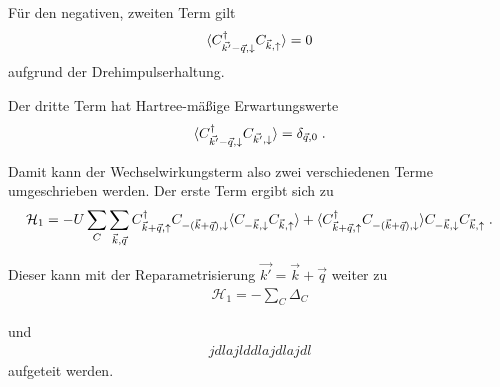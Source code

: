 Für den negativen, zweiten Term gilt
\begin{equation}
    \langle C_{\vec{k'} - \vec{q}, \downarrow}^\dagger  C_{\vec{k}, \uparrow} \rangle = 0
\end{equation}
aufgrund der Drehimpulserhaltung.

Der dritte Term hat Hartree-mäßige Erwartungswerte 
\begin{equation}
    \langle C_{\vec{k'} - \vec{q}, \downarrow}^\dagger C_{\vec{k'}, \downarrow} \rangle = \delta_{\vec{q},0} \; .
\end{equation}

Damit kann der Wechselwirkungsterm also zwei verschiedenen Terme umgeschrieben werden. Der erste Term ergibt sich zu
\begin{align}
    \mathcal{H}_1 = -U \sum_C \sum_{\vec{k},\vec{q}} C_{\vec{k}+\vec{q}, \uparrow}^\dagger C_{-(\vec{k}+\vec{q}),\downarrow} \langle C_{-\vec{k}, \downarrow} C_{\vec{k}, \uparrow} \rangle + \langle C_{\vec{k}+\vec{q}, \uparrow}^\dagger C_{-(\vec{k}+\vec{q}),\downarrow} \rangle  C_{-\vec{k}, \downarrow} C_{\vec{k}, \uparrow} \; .
\end{align}

Dieser kann mit der Reparametrisierung $\vec{k'} = \vec{k} + \vec{q}$ weiter zu 
\begin{align}
    \mathcal{H}_1 = - \sum_C \Delta_C 
\end{align}

und 
\begin{align}
    jdlajld dlajdlajdl
\end{align}
aufgeteit werden.